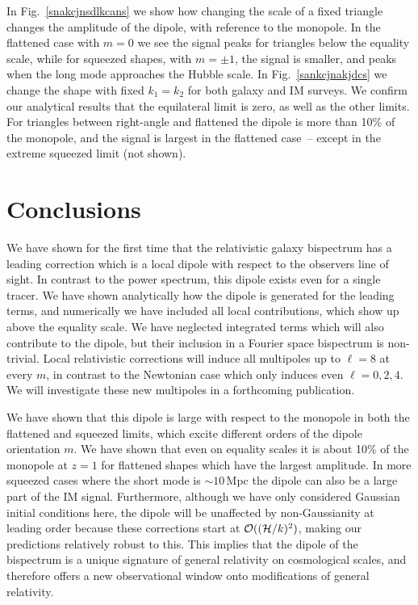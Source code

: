 In Fig.~\eqref{snakcjnsdlkcans}  we show how changing the scale of a fixed triangle changes the amplitude of the dipole, with reference to the monopole. In the flattened case with $m=0$ we see the signal peaks for triangles below the equality scale, while for squeezed shapes, with $m=\pm1$, the signal is smaller, and peaks when the long mode approaches the Hubble scale. 
In Fig.~\eqref{sankcjnakjdcs} we change the shape with fixed $k_1=k_2$ for both galaxy and IM surveys. We confirm our analytical results that the equilateral limit is zero, as well as the other limits. For triangles between right-angle and flattened the dipole is more than 10\% of the monopole, and the signal is largest in the flattened case~-- except in the extreme squeezed limit (not shown). 


\section{Conclusions}

We have shown for the first time that the relativistic galaxy bispectrum has a leading correction which is a local dipole with respect to the observers line of sight. In contrast to the power spectrum, this dipole exists even for a single tracer. We have shown analytically how the dipole is generated for the leading terms, and numerically we have included all local contributions, which show up above the equality scale. We have neglected integrated terms which will also contribute to the dipole, but their inclusion in a Fourier space bispectrum is non-trivial. Local relativistic corrections will induce all multipoles up to $\ell=8$ at every $m$, in contrast to the Newtonian case which only induces even $\ell=0,2,4$. We will investigate these new multipoles in a forthcoming publication. 

We have shown that this dipole is large with respect to the monopole in both the flattened and squeezed limits, which excite different orders of the dipole orientation $m$.  We have shown that even on equality scales it is about 10\% of the monopole at $z=1$ for flattened shapes which have the largest amplitude. In more squeezed cases where the short mode is $\sim10$\,Mpc the dipole can also be a large part of the IM signal. Furthermore, although we have only considered Gaussian initial conditions here, the dipole will be unaffected by non-Gaussianity at leading order because these corrections start at $\mathcal{O}((\mathcal{H}/k)^2)$, making our predictions relatively robust to this. This implies that the dipole of the bispectrum is a unique signature of general relativity on cosmological scales, and therefore offers a new observational window onto modifications of general relativity. 





